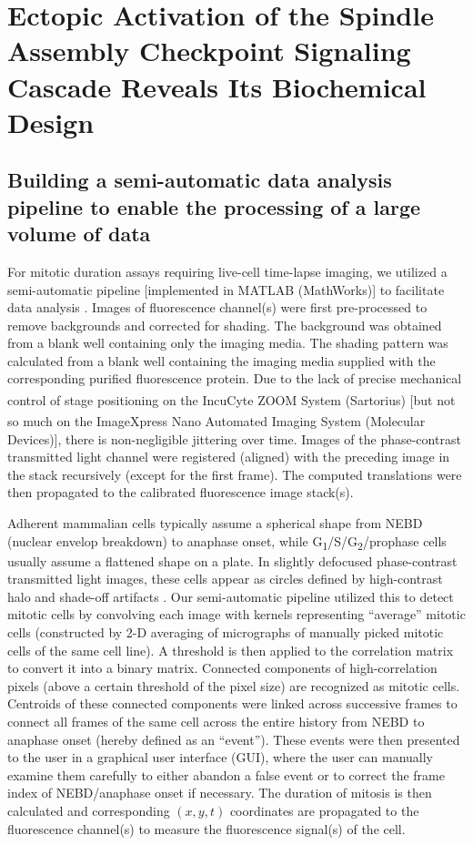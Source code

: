 \chapter{Ectopic Activation of the Spindle Assembly Checkpoint Signaling Cascade Reveals Its Biochemical Design}
\label{chpt:2}

\section{Building a semi-automatic data analysis pipeline to enable the processing of a large volume of data}
For mitotic duration assays requiring live-cell time-lapse imaging, we utilized a semi-automatic pipeline [implemented in MATLAB (MathWorks)] to facilitate data analysis . Images of fluorescence channel(s) were first pre-processed to remove backgrounds and corrected for shading. The background was obtained from a blank well containing only the imaging media. The shading pattern was calculated from a blank well containing the imaging media supplied with the corresponding purified fluorescence protein. Due to the lack of precise mechanical control of stage positioning on the IncuCyte\textsuperscript{\textregistered} ZOOM System (Sartorius) [but not so much on the ImageXpress\textsuperscript{\textregistered} Nano Automated Imaging System (Molecular Devices)], there is non-negligible jittering over time. Images of the phase-contrast transmitted light channel were registered (aligned) with the preceding image in the stack recursively (except for the first frame). The computed translations were then propagated to the calibrated fluorescence image stack(s).

Adherent mammalian cells typically assume a spherical shape from NEBD (nuclear envelop breakdown) to anaphase onset, while G\textsubscript{1}/S/G\textsubscript{2}/prophase cells usually assume a flattened shape on a plate. In slightly defocused phase-contrast transmitted light images, these cells appear as circles defined by high-contrast halo and shade-off artifacts \cite{PhaseContrastHalo}. Our semi-automatic pipeline utilized this to detect mitotic cells by convolving each image with kernels representing ``average'' mitotic cells (constructed by 2-D averaging of micrographs of manually picked mitotic cells of the same cell line). A threshold is then applied to the correlation matrix to convert it into a binary matrix. Connected components of high-correlation pixels (above a certain threshold of the pixel size) are recognized as mitotic cells. Centroids of these connected components were linked across successive frames to connect all frames of the same cell across the entire history from NEBD to anaphase onset (hereby defined as an ``event''). These events were then presented to the user in a graphical user interface (GUI), where the user can manually examine them carefully to either abandon a false event or to correct the frame index of NEBD/anaphase onset if necessary. The duration of mitosis is then calculated and corresponding $(x, y, t)$ coordinates are propagated to the fluorescence channel(s) to measure the fluorescence signal(s) of the cell.

